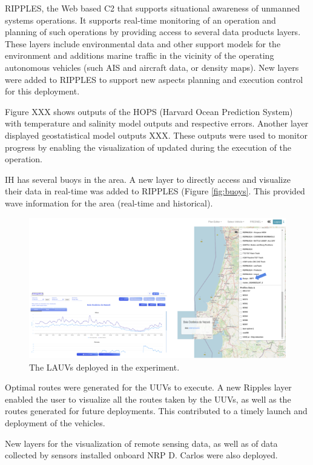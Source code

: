 RIPPLES, the Web based C2 that supports situational awareness of unmanned systems operations. It supports real-time monitoring of an operation and planning of such operations by providing access to several data products layers. These layers include environmental data and other support models for the environment and additions marine traffic in the vicinity of the operating autonomous vehicles (such AIS and aircraft data, or density maps). New layers were added to RIPPLES to support new aspects planning and execution control for this deployment. 

Figure XXX shows outputs of the HOPS (Harvard Ocean Prediction System) with temperature and salinity model outputs and respective errors. Another layer displayed geostatistical model outputs XXX. These outputs were used to monitor progress by enabling the visualization of updated during the execution of the operation.

IH has several buoys in the area. A new layer to directly access and visualize their data in real-time was added to RIPPLES (Figure \ref{fig:buoys}. This provided wave information for the area (real-time and historical).


\begin{figure}
    \centering
    \includegraphics[width=.7\linewidth]{fig/buoys.png}
    \caption{The LAUVs deployed in the experiment.}
    \label{fibuoys}
\end{figure}

 
Optimal routes were generated for the UUVs to execute. A new Ripples layer enabled the user to visualize all the routes taken by the UUVs, as well as the routes generated for future deployments. This contributed to a timely launch and deployment of the vehicles.
 
New layers for the visualization of remote sensing data, as well as of data collected by sensors installed onboard NRP D. Carlos were also deployed.



